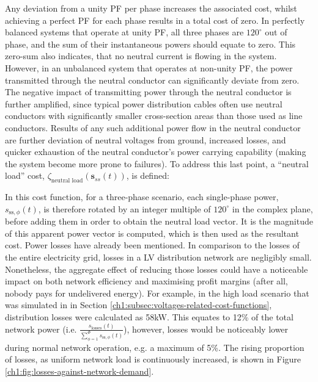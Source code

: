 


Any deviation from a unity PF per phase increases the associated cost, whilst achieving a perfect PF for each phase results in a total cost of zero.
In perfectly balanced systems that operate at unity PF, all three phases are $120^\circ$ out of phase, and the sum of their instantaneous powers should equate to zero.
This zero-sum also indicates, that no neutral current is flowing in the system.
However, in an unbalanced system that operates at non-unity PF, the power transmitted through the neutral conductor can significantly deviate from zero.
The negative impact of transmitting power through the neutral conductor is further amplified, since typical power distribution cables often use neutral conductors with significantly smaller cross-section areas than those used as line conductors.
Results of any such additional power flow in the neutral conductor are further deviation of neutral voltages from ground, increased losses, and quicker exhaustion of the neutral conductor's power carrying capability (making the system become more prone to failures).
To address this last point, a ``neutral load'' cost, $\zeta_\text{neutral load}(\textbf{s}_{ss}(t))$, is defined:



In this cost function, for a three-phase scenario, each single-phase power, $s_{\text{ss},\phi}(t)$, is therefore rotated by an integer multiple of $120^\circ$ in the complex plane, before adding them in order to obtain the neutral load vector.
It is the magnitude of this apparent power vector is computed, which is then used as the resultant cost.
Power losses have already been mentioned.
In comparison to the losses of the entire electricity grid, losses in a LV distribution network are negligibly small.
Nonetheless, the aggregate effect of reducing those losses could have a noticeable impact on both network efficiency and maximising profit margins (after all, nobody pays for undelivered energy).
For example, in the high load scenario that was simulated in in Section \ref{ch1:subsec:voltages-related-cost-functions}, distribution losses were calculated as 58kW.
This equates to 12\% of the total network power ($\text{i.e. }\frac{s_\text{losses}(t)}{\sum_{\phi=1}^\Phi{s_{\text{ss},\phi}(t)}}$), however, losses would be noticeably lower during normal network operation, e.g. a maximum of 5\%.
The rising proportion of losses, as uniform network load is continuously increased, is shown in Figure \ref{ch1:fig:losses-against-network-demand}.

